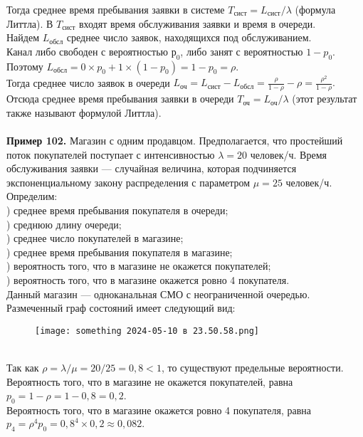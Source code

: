 \documentclass{article}
\begin{document}
\indent Тогда среднее время  пребывания заявки  в системе  $T_{\text{сист}} = L_{\text{сист}}/\lambda$  (формула Литтла). В  $T_{\text{сист}}$ входят время обслуживания заявки и время в очереди. \\ \indent 
Найдем $L_{\text{обсл}}$ среднее число заявок, находящихся под обслуживанием. \\ Канал либо свободен с вероятностью $р_0$, либо занят с вероятностью  $1- p_0$.  \\ Поэтому $L_{\text{обсл}} = 0\times p_0 + 1 \times(1-p_0)=1-p_0 = \rho.$ \\Тогда среднее число заявок в очереди $L_{\text{оч}} = L_{\text{сист}} - L_{\text{обсл}} = \frac{\rho}{1 - \rho} - \rho = \frac{\rho^2}{1-\rho}.$
Отсюда среднее время пребывания заявки в очереди $T_{\text{оч}} = L_{\text{оч}}/\lambda$ (этот результат также называют формулой Литтла).
\\ \\ 
\indent \textbf{Пример  102.} 
 Магазин с одним продавцом. Предполагается, что простейший  поток покупателей поступает с интенсивностью $\lambda = 20$ человек/ч. Время обслуживания заявки — случайная величина, которая подчиняется экспоненциальному закону распределения с параметром $\mu = 25$ человек/ч. Определим: \\ ) среднее время пребывания покупателя в очереди; \\ ) среднюю длину очереди;\\ ) среднее число покупателей в магазине; \\ ) среднее время пребывания покупателя в магазине; \\ ) вероятность того, что в магазине не окажется покупателей; \\ ) вероятность того, что в магазине окажется ровно 4 покупателя. \\ \indent Данный магазин — одноканальная СМО с неограниченной очередью. Размеченный граф состояний имеет следующий вид:
\begin{figure}[h] 
\centering
\texttt{[image: something 2024-05-10 в 23.50.58.png]}
\label{fig:my_label}
\end{figure} 
\\
\indent Так как $\rho = \lambda/\mu = 20/25 = 0,8 < 1$, 
 то существуют предельные вероятности. \\ \noindent Вероятность того, что в магазине не окажется покупателей, равна $p_0 = 1 - \rho = 1 - 0,8 = 0,2$. \\ \noindent Вероятность того,  что в магазине окажется ровно 4 покупателя, равна $p_4 = \rho^4 p_0 = 0,8^4\times0,2 \approx 0,082.$
\end{document}
